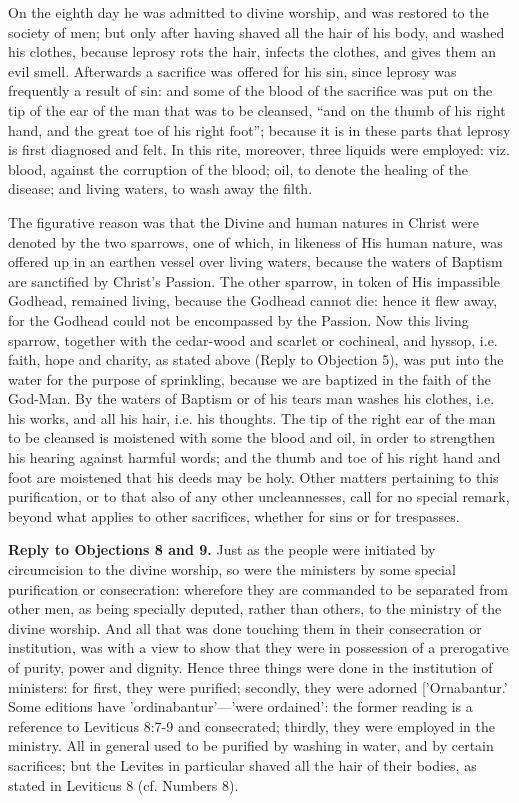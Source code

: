 On the eighth day he was admitted to divine worship, and was restored to the society of men; but only after having shaved all the hair of his body, and washed his clothes, because leprosy rots the hair, infects the clothes, and gives them an evil smell. Afterwards a sacrifice was offered for his sin, since leprosy was frequently a result of sin: and some of the blood of the sacrifice was put on the tip of the ear of the man that was to be cleansed, ``and on the thumb of his right hand, and the great toe of his right foot''; because it is in these parts that leprosy is first diagnosed and felt. In this rite, moreover, three liquids were employed: viz. blood, against the corruption of the blood; oil, to denote the healing of the disease; and living waters, to wash away the filth.

The figurative reason was that the Divine and human natures in Christ were denoted by the two sparrows, one of which, in likeness of His human nature, was offered up in an earthen vessel over living waters, because the waters of Baptism are sanctified by Christ's Passion. The other sparrow, in token of His impassible Godhead, remained living, because the Godhead cannot die: hence it flew away, for the Godhead could not be encompassed by the Passion. Now this living sparrow, together with the cedar-wood and scarlet or cochineal, and hyssop, i.e. faith, hope and charity, as stated above (Reply to Objection 5), was put into the water for the purpose of sprinkling, because we are baptized in the faith of the God-Man. By the waters of Baptism or of his tears man washes his clothes, i.e. his works, and all his hair, i.e. his thoughts. The tip of the right ear of the man to be cleansed is moistened with some the blood and oil, in order to strengthen his hearing against harmful words; and the thumb and toe of his right hand and foot are moistened that his deeds may be holy. Other matters pertaining to this purification, or to that also of any other uncleannesses, call for no special remark, beyond what applies to other sacrifices, whether for sins or for trespasses.

\textbf{Reply to Objections 8 and 9.} Just as the people were initiated by circumcision to the divine worship, so were the ministers by some special purification or consecration: wherefore they are commanded to be separated from other men, as being specially deputed, rather than others, to the ministry of the divine worship. And all that was done touching them in their consecration or institution, was with a view to show that they were in possession of a prerogative of purity, power and dignity. Hence three things were done in the institution of ministers: for first, they were purified; secondly, they were adorned ['Ornabantur.' Some editions have 'ordinabantur'—'were ordained': the former reading is a reference to Leviticus 8:7-9 and consecrated; thirdly, they were employed in the ministry. All in general used to be purified by washing in water, and by certain sacrifices; but the Levites in particular shaved all the hair of their bodies, as stated in Leviticus 8 (cf. Numbers 8).

